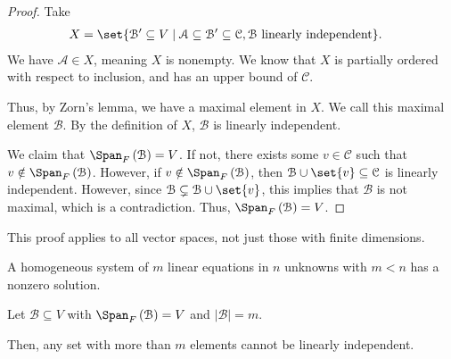 \documentclass[10pt]{mypackage}
\begin{document}
\begin{proof}
  Take
  \begin{align*}
    X &= \set{\mathcal{B}'\subseteq V\mid \mathcal{A}\subseteq \mathcal{B}'\subseteq \mathcal{C},\mathcal{B}\text{ linearly independent}}.
  \end{align*}
  We have $\mathcal{A}\in X$, meaning $X$ is nonempty. We know that $X$ is partially ordered with respect to inclusion, and has an upper bound of $\mathcal{C}$.\newline

  Thus, by Zorn's lemma, we have a maximal element in $X$. We call this maximal element $\mathcal{B}$. By the definition of $X$, $\mathcal{B}$ is linearly independent.\newline

  We claim that $\Span_{F}\left(\mathcal{B}\right) = V$. If not, there exists some $v\in \mathcal{C}$ such that $v\notin \Span_{F}\left(\mathcal{B}\right)$. However, if $v\notin \Span_{F}\left(\mathcal{B}\right)$, then $\mathcal{B}\cup \set{v}\subseteq \mathcal{C}$ is linearly independent. However, since $\mathcal{B}\subsetneq \mathcal{B}\cup \set{v}$, this implies that $\mathcal{B}$ is not maximal, which is a contradiction. Thus, $\Span_{F}\left(\mathcal{B}\right) = V$.
\end{proof}
\begin{remark}
This proof applies to all vector spaces, not just those with finite dimensions.
\end{remark}
\begin{lemma}
  A homogeneous system of $m$ linear equations in $n$ unknowns with $m < n$ has a nonzero solution.
\end{lemma}
\begin{corollary}
  Let $\mathcal{B}\subseteq V$ with $\Span_{F}\left(\mathcal{B}\right) = V$ and $\left\vert \mathcal{B} \right\vert = m$.\newline

  Then, any set with more than $m$ elements cannot be linearly independent.
\end{corollary}
\end{document}

